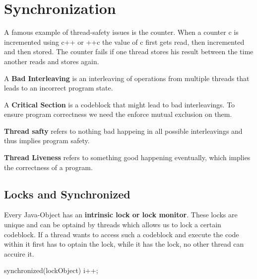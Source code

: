 \section{Synchronization}

\begin{example}
    A famous example of thread-safety issues is the counter. When a counter c is incremented using c++ or ++c the value of c
    first gets read, then incremented and then stored. The counter fails if one thread stores his result between
    the time another reads and stores again.
\end{example}

\begin{definition}
    A \textbf{Bad Interleaving} is an interleaving of operations from multiple threads that leads to an incorrect
    program state.
\end{definition}

\begin{definition}
    A \textbf{Critical Section} is a codeblock that might lead to bad interleavings. To ensure program correctness we need the enforce mutual exclusion on them.
\end{definition}

\begin{definition}
    \textbf{Thread safty} refers to nothing bad happeing in all possible interleavings and thus implies program safety.
\end{definition}

\begin{definition}
    \textbf{Thread Liveness} refers to something good happening eventually, which implies the correctness of a program.
\end{definition}

\subsection{Locks and Synchronized}

Every Java-Object has an \textbf{intrinsic lock or lock monitor}. These locks are unique and can be optaind by
threads which allows us to lock a certain codeblock. If a thread wants to access such a codeblock and
execute the code within it first has to optain the lock, while it has the lock, no other thread can accuire
it.

\begin{codeexample}
synchronized(lockObject) {
    i++;
}
\end{codeexample}

